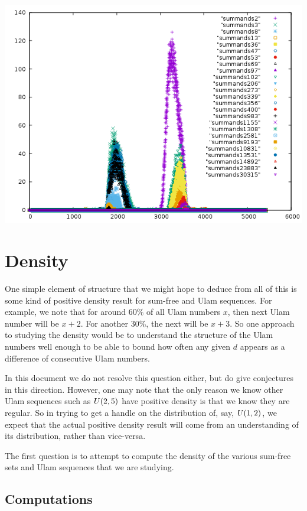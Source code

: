 \documentclass{report}
\theoremstyle{remark}
\numberwithin{equation}{section}
\begin{document}
\includegraphics[scale=0.5]{../figs/shifted_summands_mod_5422.png}

\section{Density}

One simple element of structure that we might hope to deduce from all
of this is some kind of positive density result for sum-free and Ulam
sequences.  For example, we note that for around 60\% of all Ulam
numbers $x$, then next Ulam number will be $x+2$.  For another 30\%,
the next will be $x+3$.  So one approach to studying the density would
be to understand the structure of the Ulam numbers well enough to be
able to bound how often any given $d$ appears as a difference of
consecutive Ulam numbers.

In this document we do not resolve this question either, but do give
conjectures in this direction.  However, one may note that the only
reason we know other Ulam sequences such as $U(2,5)$ have
positive density is that we know they are regular.  So in trying to
get a handle on the distribution of, say, $U(1,2)$, we expect
that the actual positive density result will come from an
understanding of its distribution, rather than vice-versa.

The first question is to attempt to compute the density of the various
sum-free sets and Ulam sequences that we are studying.  

\subsection{Computations}
\end{document}
